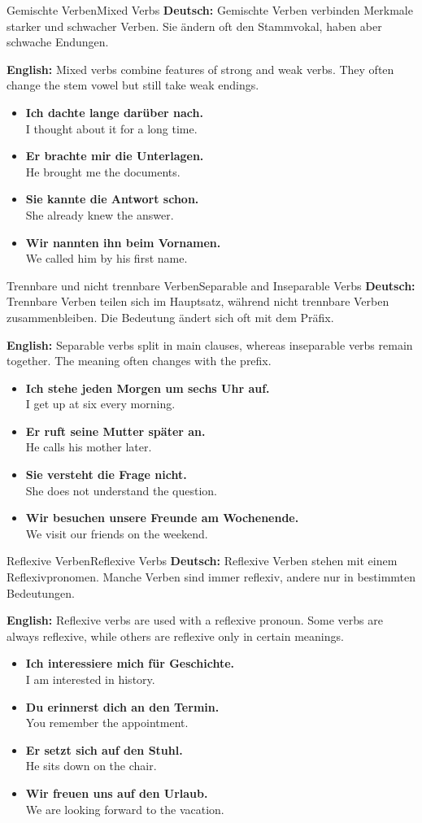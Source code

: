 \documentclass[a4paper,11pt]{article}
\newcommand{\GermanText}[1]{\textbf{Deutsch: }#1\par}
\newcommand{\EnglishText}[1]{{\color{SoftGray}\textbf{English: }#1\par}}
\newcommand{\ExampleItem}[2]{\item \textbf{#1}\\{\color{SoftGray}#2}}
\begin{document}
\begin{grammarentry}{Gemischte Verben}{Mixed Verbs}
    \GermanText{Gemischte Verben verbinden Merkmale starker und schwacher Verben. Sie ändern oft den Stammvokal, haben aber schwache Endungen.}
    \EnglishText{Mixed verbs combine features of strong and weak verbs. They often change the stem vowel but still take weak endings.}
    \begin{exbox}
        \begin{itemize}
            \ExampleItem{Ich dachte lange darüber nach.}{I thought about it for a long time.}
            \ExampleItem{Er brachte mir die Unterlagen.}{He brought me the documents.}
            \ExampleItem{Sie kannte die Antwort schon.}{She already knew the answer.}
            \ExampleItem{Wir nannten ihn beim Vornamen.}{We called him by his first name.}
        \end{itemize}
    \end{exbox}
\end{grammarentry}

\begin{grammarentry}{Trennbare und nicht trennbare Verben}{Separable and Inseparable Verbs}
    \GermanText{Trennbare Verben teilen sich im Hauptsatz, während nicht trennbare Verben zusammenbleiben. Die Bedeutung ändert sich oft mit dem Präfix.}
    \EnglishText{Separable verbs split in main clauses, whereas inseparable verbs remain together. The meaning often changes with the prefix.}
    \begin{exbox}
        \begin{itemize}
            \ExampleItem{Ich stehe jeden Morgen um sechs Uhr auf.}{I get up at six every morning.}
            \ExampleItem{Er ruft seine Mutter später an.}{He calls his mother later.}
            \ExampleItem{Sie versteht die Frage nicht.}{She does not understand the question.}
            \ExampleItem{Wir besuchen unsere Freunde am Wochenende.}{We visit our friends on the weekend.}
        \end{itemize}
    \end{exbox}
\end{grammarentry}

\begin{grammarentry}{Reflexive Verben}{Reflexive Verbs}
    \GermanText{Reflexive Verben stehen mit einem Reflexivpronomen. Manche Verben sind immer reflexiv, andere nur in bestimmten Bedeutungen.}
    \EnglishText{Reflexive verbs are used with a reflexive pronoun. Some verbs are always reflexive, while others are reflexive only in certain meanings.}
    \begin{exbox}
        \begin{itemize}
            \ExampleItem{Ich interessiere mich für Geschichte.}{I am interested in history.}
            \ExampleItem{Du erinnerst dich an den Termin.}{You remember the appointment.}
            \ExampleItem{Er setzt sich auf den Stuhl.}{He sits down on the chair.}
            \ExampleItem{Wir freuen uns auf den Urlaub.}{We are looking forward to the vacation.}
        \end{itemize}
    \end{exbox}
\end{grammarentry}
\end{document}
